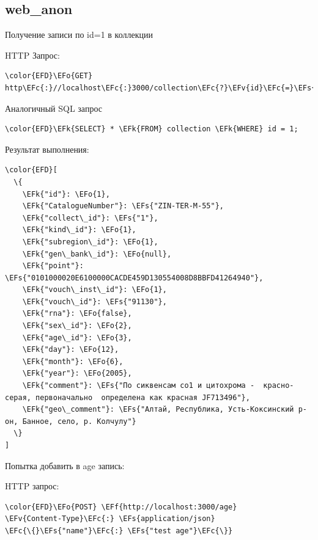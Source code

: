 \documentclass[14pt]{extarticle}
\newcommand{\EFc}[1]{\textcolor{EFc}{#1}} %
\newcommand{\EFs}[1]{\textcolor{EFs}{#1}} %
\newcommand{\EFk}[1]{\textcolor{EFk}{#1}} %
\newcommand{\EFf}[1]{\textcolor{EFf}{#1}} %
\newcommand{\EFv}[1]{\textcolor{EFv}{#1}} %
\newcommand{\EFo}[1]{\textcolor{EFo}{#1}} %
\begin{document}
\subsection{web\_​anon}
\label{sec:orga3dd3c7}

Получение записи по id=1 в коллекции

HTTP Запрос:
\begin{Code}
\begin{Verbatim}
\color{EFD}\EFo{GET} http\EFc{:}//localhost\EFc{:}3000/collection\EFc{?}\EFv{id}\EFc{=}\EFs{eq.1}
\end{Verbatim}
\end{Code}

Аналогичный SQL запрос
\begin{Code}
\begin{Verbatim}
\color{EFD}\EFk{SELECT} * \EFk{FROM} collection \EFk{WHERE} id = 1;
\end{Verbatim}
\end{Code}


Результат выполнения:
\begin{Code}
\begin{Verbatim}
\color{EFD}[
  \{
    \EFk{"id"}: \EFo{1},
    \EFk{"CatalogueNumber"}: \EFs{"ZIN-TER-M-55"},
    \EFk{"collect\_id"}: \EFs{"1"},
    \EFk{"kind\_id"}: \EFo{1},
    \EFk{"subregion\_id"}: \EFo{1},
    \EFk{"gen\_bank\_id"}: \EFo{null},
    \EFk{"point"}: \EFs{"0101000020E6100000CACDE459D130554008D8BBFD41264940"},
    \EFk{"vouch\_inst\_id"}: \EFo{1},
    \EFk{"vouch\_id"}: \EFs{"91130"},
    \EFk{"rna"}: \EFo{false},
    \EFk{"sex\_id"}: \EFo{2},
    \EFk{"age\_id"}: \EFo{3},
    \EFk{"day"}: \EFo{12},
    \EFk{"month"}: \EFo{6},
    \EFk{"year"}: \EFo{2005},
    \EFk{"comment"}: \EFs{"По сиквенсам со1 и цитохрома -  красно-серая, первоначально  определена как красная JF713496"},
    \EFk{"geo\_comment"}: \EFs{"Алтай, Республика, Усть-Коксинский р-он, Банное, село, р. Колчулу"}
  \}
]
\end{Verbatim}
\end{Code}

Попытка добавить в age запись:

HTTP запрос:
\begin{Code}
\begin{Verbatim}
\color{EFD}\EFo{POST} \EFf{http://localhost:3000/age}
\EFv{Content-Type}\EFc{:} \EFs{application/json}
\EFc{\{}\EFs{"name"}\EFc{:} \EFs{"test age"}\EFc{\}}
\end{Verbatim}
\end{Code}
\end{document}
